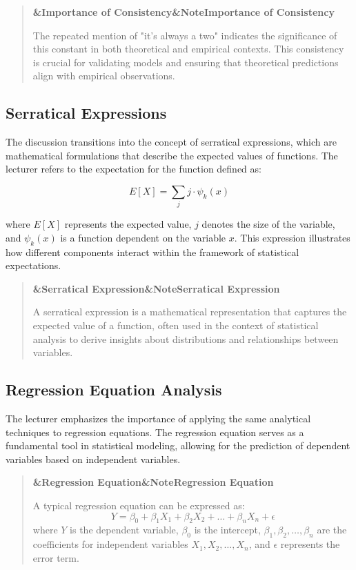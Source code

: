 \documentclass[a4paper]{article}
\newcommand{\boxheading}[1]{%
  \par\smallskip
  \noindent\textbf{\ifx&#1&Note\else#1\fi}\par
  \smallskip
}
\newenvironment{defbox}[1][]{%
  \begin{quote}\color{green!40!black}\boxheading{#1}\normalcolor
}{\end{quote}}
\newenvironment{exbox}[1][]{%
  \begin{quote}\color{brown!70!black}\boxheading{#1}\normalcolor
}{\end{quote}}
\newenvironment{rembox}[1][]{%
  \begin{quote}\color{black!70}\boxheading{#1}\normalcolor
}{\end{quote}}
\begin{document}
\begin{rembox}[Importance of Consistency]
The repeated mention of "it's always a two" indicates the significance of this constant in both theoretical and empirical contexts. This consistency is crucial for validating models and ensuring that theoretical predictions align with empirical observations.
\end{rembox}

\subsection{Serratical Expressions}
The discussion transitions into the concept of serratical expressions, which are mathematical formulations that describe the expected values of functions. The lecturer refers to the expectation for the function defined as:

\begin{equation}
E[X] = \sum_{j} j \cdot \psi_k(x)
\end{equation}

where \( E[X] \) represents the expected value, \( j \) denotes the size of the variable, and \( \psi_k(x) \) is a function dependent on the variable \( x \). This expression illustrates how different components interact within the framework of statistical expectations.

\begin{defbox}[Serratical Expression]
A serratical expression is a mathematical representation that captures the expected value of a function, often used in the context of statistical analysis to derive insights about distributions and relationships between variables.
\end{defbox}

\subsection{Regression Equation Analysis}
The lecturer emphasizes the importance of applying the same analytical techniques to regression equations. The regression equation serves as a fundamental tool in statistical modeling, allowing for the prediction of dependent variables based on independent variables.

\begin{exbox}[Regression Equation]
A typical regression equation can be expressed as:
\begin{equation}
Y = \beta_0 + \beta_1 X_1 + \beta_2 X_2 + \ldots + \beta_n X_n + \epsilon
\end{equation}
where \( Y \) is the dependent variable, \( \beta_0 \) is the intercept, \( \beta_1, \beta_2, \ldots, \beta_n \) are the coefficients for independent variables \( X_1, X_2, \ldots, X_n \), and \( \epsilon \) represents the error term.
\end{exbox}
\end{document}
